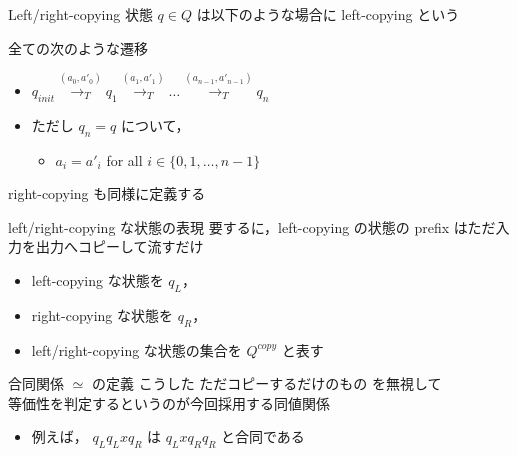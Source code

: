 \documentclass[presentation, xetex]{beamer}
\begin{document}
\begin{frame}[label={sec:org8ddbc93}]{Left/right-copying}
状態 \(q \in Q\) は以下のような場合に \alert{\alert{left-copying}} という

全ての次のような遷移
\begin{itemize}
\item \(q_{init} \overset{(a_0, a'_0)}{\longrightarrow_T} q_1 \overset{(a_1, a'_1)}{\longrightarrow_T} \dots \overset{(a_{n-1}, a'_{n-1})}{\longrightarrow_T} q_n\)
\item ただし \(q_n = q\)
について，
\begin{itemize}
\item \(a_i = a'_i\) for all \(i \in \{0, 1, \dots, n - 1\}\)
\end{itemize}
\end{itemize}


\hspace{1em}


right-copying も同様に定義する
\end{frame}

\begin{frame}[label={sec:orgd86ad7b}]{left/right-copying な状態の表現}
要するに，left-copying の状態の prefix はただ入力を出力へコピーして流すだけ

\begin{itemize}
\item left-copying な状態を \(q_L\)，
\item right-copying な状態を \(q_R\)，
\item left/right-copying な状態の集合を \(Q^{copy}\)
と表す
\end{itemize}
\end{frame}


\begin{frame}[label={sec:orgcbf8cad}]{合同関係 \(\simeq\) の定義}
こうした \alert{\alert{ただコピーするだけのもの}} を無視して\\
等価性を判定するというのが今回採用する同値関係
\begin{itemize}
\item 例えば，
\(q_L q_L x q_R\)
は
\(q_L x q_R q_R\)
と合同である
\end{itemize}
\end{frame}
\end{document}
